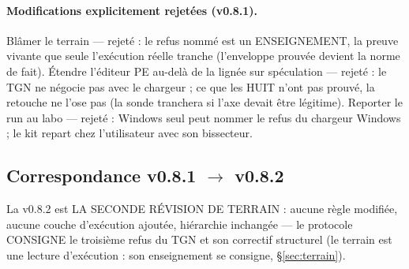 \paragraph{Modifications explicitement rejetées (v0.8.1).} Blâmer le terrain —
rejeté : le refus nommé est un ENSEIGNEMENT, la preuve vivante que seule
l'exécution réelle tranche (l'enveloppe prouvée devient la norme de fait).
Étendre l'éditeur PE au-delà de la lignée sur spéculation — rejeté : le TGN ne
négocie pas avec le chargeur ; ce que les HUIT n'ont pas prouvé, la retouche ne
l'ose pas (la sonde tranchera si l'axe devait être légitime). Reporter le run au
labo — rejeté : Windows seul peut nommer le refus du chargeur Windows ; le kit
repart chez l'utilisateur avec son bissecteur.

\subsection{Correspondance v0.8.1 $\to$ v0.8.2}\label{sec:evolutions082}

La v0.8.2 est LA SECONDE RÉVISION DE TERRAIN : aucune règle modifiée, aucune
couche d'exécution ajoutée, hiérarchie inchangée — le protocole CONSIGNE le
troisième refus du TGN et son correctif structurel (le terrain est une lecture
d'exécution : son enseignement se consigne, §\ref{sec:terrain}).

